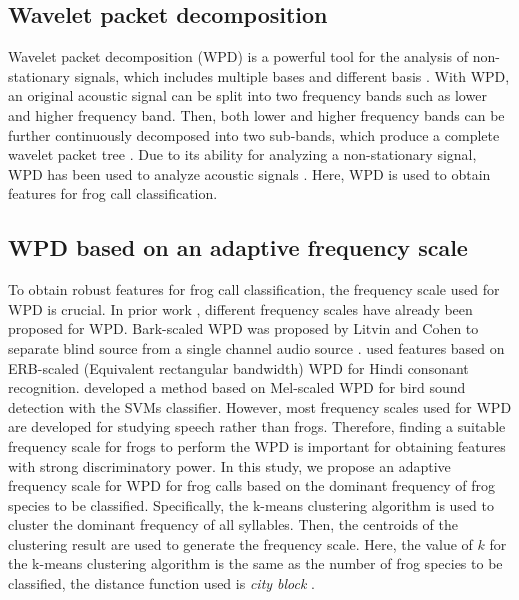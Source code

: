 \subsection{Wavelet packet decomposition}
Wavelet packet decomposition (WPD) is a powerful tool for the analysis of non-stationary signals, which includes multiple bases and different basis \citep{selin2007wavelets}. With WPD, an original acoustic signal can be split into two frequency bands such as lower and higher frequency band. Then, both lower and higher frequency bands can be further continuously decomposed into two sub-bands, which produce a complete wavelet packet tree \citep{farooq2001mel}. Due to its ability for analyzing a non-stationary signal, WPD has been used to analyze acoustic signals \citep{selin2007wavelets, ren2008perceptually}. Here, WPD is used to obtain features for frog call classification. 

\subsection{WPD based on an adaptive frequency scale}
To obtain robust features for frog call classification, the frequency scale used for WPD is crucial. In prior work \citep{barkWPDraey, Biswas20141111, Zhang2015108}, different frequency scales have already been proposed for WPD. Bark-scaled WPD was proposed by Litvin and Cohen to separate blind source from a single channel audio source \citep{barkWPDraey}. \cite{Biswas20141111} used features based on ERB-scaled (Equivalent rectangular bandwidth) WPD for Hindi consonant recognition.  \cite{Zhang2015108} developed a method based on Mel-scaled WPD for bird sound detection with the SVMs classifier. However, most frequency scales used for WPD are developed for studying speech rather than frogs. Therefore, finding a suitable frequency scale for frogs to perform the WPD is important for obtaining features with strong discriminatory power. In this study, we propose an adaptive frequency scale for WPD for frog calls based on the dominant frequency of frog species to be classified. Specifically, the k-means clustering algorithm is used to cluster the dominant frequency of all syllables. Then, the centroids of the clustering result are used to generate the frequency scale. Here, the value of $k$ for the k-means clustering algorithm is the same as the number of frog species to be classified, the distance function used is \textit{city block} \citep{Melter1987235}. 


%
%




